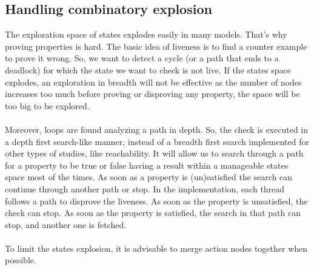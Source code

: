 \documentclass[12pt]{article}
\begin{document}
\subsection{Handling combinatory explosion}
The exploration space of states explodes easily in many models. That's why proving properties is hard. The basic idea of liveness is to find a counter example to prove it wrong. So, we want to detect a cycle (or a path that ends to a deadlock) for which the state we want to check is not live. If the states space explodes, an exploration in breadth will not be effective as the number of nodes increases too much before proving or disproving any property, the space will be too big to be explored.
\\\\
Moreover, loops are found analyzing a path in depth. So, the check is executed in a depth first search-like manner, instead of a breadth first search implemented for other types of studies, like reachability. It will allow us to search through a path for a property to be true or false having a result within a manageable states  space most of the times. As soon as a property is (un)satisfied the search can continue through another path or stop. In the implementation, each thread follows a path to disprove the liveness. As soon as the property is unsatisfied, the check can stop. As soon as the property is satisfied, the search in that path can stop, and another one is fetched.
\\\\
To limit the states explosion, it is advisable to merge action nodes together when possible.
\end{document}
